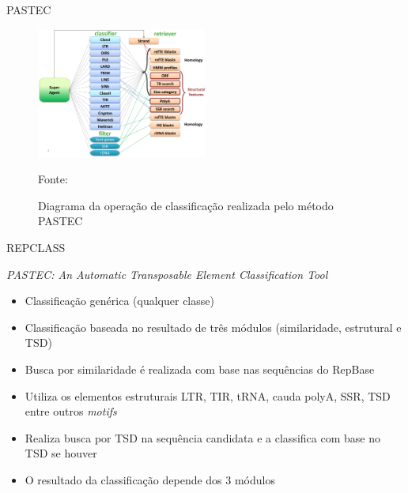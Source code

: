 \documentclass[%
  xcolor=table,%
  10pt,%
  aspectratio = 169,%
  compress,%
  t,%
]{beamer}%
\begin{document}
\begin{frame}{}{PASTEC}
    \begin{figure}
        \centering
        \includegraphics[width=0.5\textwidth]{./Figuras/workflow-pastec.png}
        \caption{Diagrama da operação de classificação realizada pelo método PASTEC}
        \scriptsize Fonte: \cite{pastec}
    \end{figure}
\end{frame}

\begin{frame}{}{REPCLASS}
    \begin{block}{\textit{PASTEC: An Automatic Transposable Element Classification Tool}}
        \begin{itemize}
            \item Classificação genérica (qualquer classe)
            \item Classificação baseada no resultado de três módulos (similaridade, estrutural e TSD)
            \item Busca por similaridade é realizada com base nas sequências do RepBase
            \item Utiliza os elementos estruturais LTR, TIR, tRNA, cauda polyA, SSR, TSD entre outros \textit{motifs}
            \item Realiza busca por TSD na sequência candidata e a classifica com base no TSD se houver
            \item O resultado da classificação depende dos 3 módulos
        \end{itemize}
    \end{block}
\end{frame}
\end{document}
